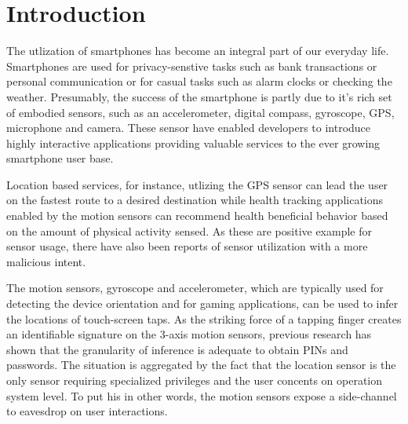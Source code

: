 \chapter{Introduction\label{cha:chapter1}}
The utlization of smartphones has become an integral part of our everyday life. Smartphones are used for privacy-senstive tasks such as bank transactions or personal communication or for casual tasks such as alarm clocks or checking the weather. Presumably, the success of the smartphone is partly due to it's rich set of embodied sensors, such as an accelerometer, digital compass, gyroscope, GPS, microphone and camera. These sensor have enabled developers to introduce highly interactive applications providing valuable services to the ever growing smartphone user base.

Location based services, for instance, utlizing the GPS sensor can lead the user on the fastest route to a desired destination while health tracking applications enabled by the motion sensors can recommend health beneficial behavior based on the amount of physical activity sensed. As these are positive example for sensor usage, there have also been reports of sensor utilization with a more malicious intent.

The motion sensors, gyroscope and accelerometer, which are typically used for detecting the device orientation and for gaming applications, can be used to infer the locations of touch-screen taps. As the striking force of a tapping finger creates an identifiable signature on the 3-axis motion sensors, previous research has shown that the granularity of inference is adequate to obtain PINs and passwords. The situation is aggregated by the fact that the location sensor is the only sensor requiring specialized privileges and the user concents on operation system level. To put his in other words, the motion sensors expose a side-channel to eavesdrop on user interactions.








